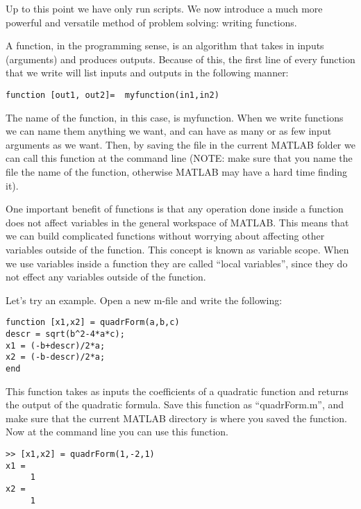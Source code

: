 

Up to this point we have only run scripts. We now introduce a much more powerful and versatile method of problem solving: writing functions.

A function, in the programming sense, is an algorithm that takes in inputs (arguments) and produces outputs. Because of this, the first line of every function that we write will list inputs and outputs in the following manner:

\begin{lstlisting}[style=matlab]
function [out1, out2]=  myfunction(in1,in2)
\end{lstlisting}

The name of the function, in this case, is myfunction. When we write functions we can name them anything we want, and can have as many or as few input arguments as we want. Then, by saving the file in the current MATLAB folder we can call this function at the command line (NOTE: make sure that you name the file the name of the function, otherwise MATLAB may have a hard time finding it).

One important benefit of functions is that any operation done inside a function does not affect variables in the general workspace of MATLAB. This means that we can build complicated functions without worrying about affecting other variables outside of the function. This concept is known as variable scope. When we use variables inside a function they are called ``local variables'', since they do not effect any variables outside of the function.

Let's try an example. Open a new m-file and write the following:

\begin{lstlisting}[style=matlab]
function [x1,x2] = quadrForm(a,b,c)
descr = sqrt(b^2-4*a*c);
x1 = (-b+descr)/2*a;
x2 = (-b-descr)/2*a;
end
\end{lstlisting}

This function takes as inputs the coefficients of a quadratic function and returns the output of the quadratic formula. Save this function as ``quadrForm.m'', and make sure that the current MATLAB directory is where you saved the function. Now at the command line you can use this function.

\begin{lstlisting}[style=matlab]
>> [x1,x2] = quadrForm(1,-2,1)
x1 =
     1
x2 =
     1
\end{lstlisting}

